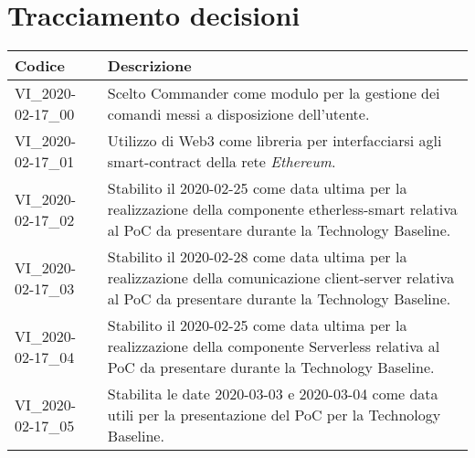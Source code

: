 \section{Tracciamento decisioni}
\renewcommand{\arraystretch}{1.8}

\begin{longtable}{|p{5cm}|p{8cm}|}
	\hline
	
	\rowcolor{header}
	\textbf{Codice} &  \textbf{Descrizione}\\
	
	\hline
	
	VI\_2020-02-17\_00 & Scelto Commander come modulo per la gestione dei comandi messi a disposizione dell'utente.  \\
	VI\_2020-02-17\_01 & Utilizzo di Web3 come libreria per interfacciarsi agli smart-contract della rete \textit{Ethereum}. \\
	VI\_2020-02-17\_02 & Stabilito il 2020-02-25 come data ultima per la realizzazione della componente etherless-smart relativa al PoC da presentare durante la Technology Baseline. \\
	VI\_2020-02-17\_03 & Stabilito il 2020-02-28 come data ultima per la realizzazione della comunicazione client-server relativa al PoC da presentare durante la Technology Baseline. \\
	VI\_2020-02-17\_04 & Stabilito il 2020-02-25 come data ultima per la realizzazione della componente Serverless relativa al PoC da presentare durante la Technology Baseline. \\
	VI\_2020-02-17\_05 & Stabilita le date 2020-03-03 e 2020-03-04 come data utili per la presentazione del PoC per la Technology Baseline. \\
	
	\hline
\end{longtable}